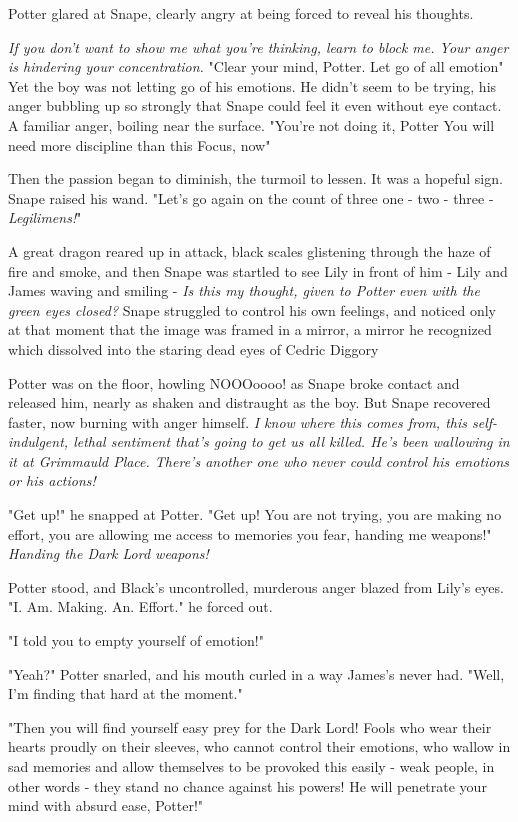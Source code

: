 Potter glared at Snape, clearly angry at being forced to reveal his thoughts.

\emph{If you don't want to show me what you're thinking, learn to block me. Your anger is hindering your concentration.} "Clear your mind, Potter. Let go of all emotion{\el}" Yet the boy was not letting go of his emotions. He didn't seem to be trying, his anger bubbling up so strongly that Snape could feel it even without eye contact. A familiar anger, boiling near the surface. "You're not doing it, Potter{\el} You will need more discipline than this{\el} Focus, now{\el}"

Then the passion began to diminish, the turmoil to lessen. It was a hopeful sign. Snape raised his wand. "Let's go again{\el} on the count of three{\el} one - two - three - \emph{Legilimens!}"

A great dragon reared up in attack, black scales glistening through the haze of fire and smoke, and then{\el} Snape was startled to see Lily in front of him - Lily and James waving and smiling - \emph{Is this my thought, given to Potter even with the green eyes closed?} Snape struggled to control his own feelings, and noticed only at that moment that the image was framed in a mirror, a mirror he recognized{\el} which dissolved into the staring dead eyes of Cedric Diggory{\el}

Potter was on the floor, howling NOOOoooo! as Snape broke contact and released him, nearly as shaken and distraught as the boy. But Snape recovered faster, now burning with anger himself. \emph{I know where this comes from, this self-indulgent, lethal sentiment that's going to get us all killed. He's been wallowing in it at Grimmauld Place. There's another one who never could control his emotions or his actions!}

"Get up!" he snapped at Potter. "Get up! You are not trying, you are making no effort, you are allowing me access to memories you fear, handing me weapons!" \emph{Handing the Dark Lord weapons!}

Potter stood, and Black's uncontrolled, murderous anger blazed from Lily's eyes. "I. Am. Making. An. Effort." he forced out.

"I told you to empty yourself of emotion!"

"Yeah?" Potter snarled, and his mouth curled in a way James's never had. "Well, I'm finding that hard at the moment."

"Then you will find yourself easy prey for the Dark Lord! Fools who wear their hearts proudly on their sleeves, who cannot control their emotions, who wallow in sad memories and allow themselves to be provoked this easily - weak people, in other words - they stand no chance against his powers! He will penetrate your mind with absurd ease, Potter!"

